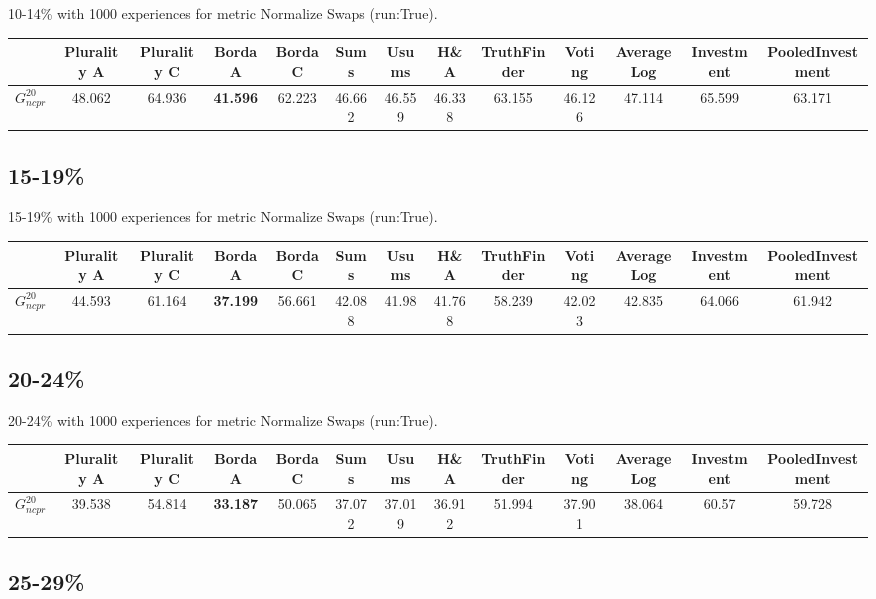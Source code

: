 \documentclass{article}
\newcommand{\graph}[2]{$G_{#1}^{#2}$}
\begin{document}
10-14\% with 1000 experiences for metric Normalize Swaps (run:True).

\noindent\begin{tabular}{|l|c|c|c|c|c|c|c|c|c|c|c|c|}
\hline
& Plurality A& Plurality C& Borda A& Borda C& Sums& Usums& H\&A& TruthFinder& Voting& AverageLog& Investment& PooledInvestment\\
\hline
\graph{ncpr}{20} &48.062&64.936&\textbf{41.596}&62.223&46.662&46.559&46.338&63.155&46.126&47.114&65.599&63.171\\
\hline
\end{tabular}
\newpage

\subsection{15-19\%}

15-19\% with 1000 experiences for metric Normalize Swaps (run:True).

\noindent\begin{tabular}{|l|c|c|c|c|c|c|c|c|c|c|c|c|}
\hline
& Plurality A& Plurality C& Borda A& Borda C& Sums& Usums& H\&A& TruthFinder& Voting& AverageLog& Investment& PooledInvestment\\
\hline
\graph{ncpr}{20} &44.593&61.164&\textbf{37.199}&56.661&42.088&41.98&41.768&58.239&42.023&42.835&64.066&61.942\\
\hline
\end{tabular}
\newpage

\subsection{20-24\%}

20-24\% with 1000 experiences for metric Normalize Swaps (run:True).

\noindent\begin{tabular}{|l|c|c|c|c|c|c|c|c|c|c|c|c|}
\hline
& Plurality A& Plurality C& Borda A& Borda C& Sums& Usums& H\&A& TruthFinder& Voting& AverageLog& Investment& PooledInvestment\\
\hline
\graph{ncpr}{20} &39.538&54.814&\textbf{33.187}&50.065&37.072&37.019&36.912&51.994&37.901&38.064&60.57&59.728\\
\hline
\end{tabular}
\newpage

\subsection{25-29\%}
\end{document}
